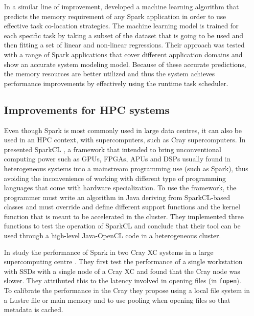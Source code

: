 \documentclass{article}
\begin{document}
In a similar line of improvement, \citeauthor{Marco2017} \cite{Marco2017} developed a machine learning algorithm that predicts the memory requirement of any Spark application in order to use effective task co-location strategies. The machine learning model is trained for each specific task by taking a subset of the dataset that is going to be used and then fitting a set of linear and non-linear regressions. Their approach was tested with a range of Spark applications that cover different application domains and show an accurate system modeling model. Because of these accurate predictions, the memory resources are better utilized and thus the system achieves performance improvements by effectively using the runtime task scheduler.

\subsection{Improvements for HPC systems}

Even though Spark is most commonly used in large data centres, it can also be used in an HPC context, with supercomputers, such as Cray supercomputers. In \citeyear{Segal2015} \citeauthor{Segal2015} presented SparkCL \cite{Segal2015}, a framework that intended to bring unconventional computing power such as GPUs, FPGAs, APUs and DSPs usually found in heterogeneous systems into a mainstream programming use (such as Spark), thus avoiding the inconvenience of working with different type of programming languages that come with hardware specialization. To use the framework, the programmer must write an algorithm in Java deriving from SparkCL-based classes and must override and define different support functions and the kernel function that is meant to be accelerated in the cluster. They implemented three functions to test the operation of SparkCL and conclude that their tool can be used through a high-level Java-OpenCL code in a heterogeneous cluster.

In \citeyear{Chaimov2016} \citeauthor{Chaimov2016} study the performance of Spark in two Cray XC systems in a large supercomputing centre \cite{Chaimov2016}. They first test the performance of a single workstation with SSDs with a single node of a Cray XC and found that the Cray node was slower. They attributed this to the latency involved in opening files (in \texttt{fopen}). To calibrate the performance in the Cray they propose using a local file system in a Lustre file or main memory and to use pooling when opening files so that metadata is cached.
\end{document}
